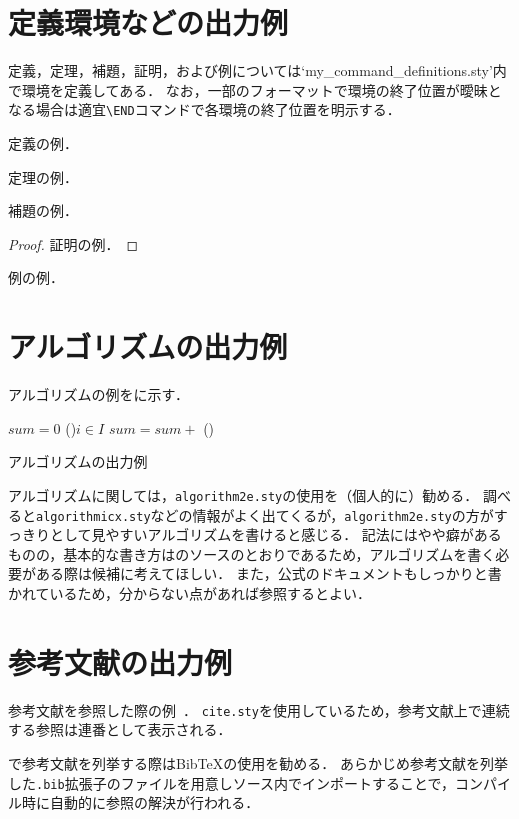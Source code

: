 \section{定義環境などの出力例}

定義，定理，補題，証明，および例については`my\_command\_definitions.sty'内で環境を定義してある．
なお，一部のフォーマットで環境の終了位置が曖昧となる場合は適宜\texttt{\textbackslash END}コマンドで各環境の終了位置を明示する．

\begin{definition}\label{def:example}
  定義の例．
  \END
\end{definition}

\begin{theorem}\label{thm:example}
  定理の例．
  \END
\end{theorem}

\begin{lemma}\label{lem:example}
  補題の例．
  \END
\end{lemma}

\begin{proof}
  証明の例．
\end{proof}

\begin{example}\label{eg:example}
  例の例．
  \END
\end{example}



\section{アルゴリズムの出力例}

アルゴリズムの例を\Fig{\ref{fig:algo:sample}}に示す．

\begin{algorithm}[t]
  \small
  \DontPrintSemicolon
  $sum = 0$\;
  \ForEach(){$i \in I$}{
    $sum = sum +$ 
  }
  \BlankLine
  \Proc(){}{
  }
  \caption{アルゴリズムの出力例}
  \label{fig:algo:sample}
\end{algorithm}

アルゴリズムに関しては，\texttt{algorithm2e.sty}の使用を（個人的に）勧める．
調べると\texttt{algorithmicx.sty}などの情報がよく出てくるが，\texttt{algorithm2e.sty}の方がすっきりとして見やすいアルゴリズムを書けると感じる．
記法にはやや癖があるものの，基本的な書き方は\Fig{\ref{fig:algo:sample}}のソースのとおりであるため，アルゴリズムを書く必要がある際は候補に考えてほしい．
また，公式のドキュメントもしっかりと書かれているため，分からない点があれば参照するとよい．



\section{参考文献の出力例}

参考文献を参照した際の例~\cite{book:Codd2002,book:Bayer2002:1,book:Bayer2002:2}．
\texttt{cite.sty}を使用しているため，参考文献上で連続する参照は連番として表示される．

{\LaTeXe}で参考文献を列挙する際はBibTeXの使用を勧める．
あらかじめ参考文献を列挙した\texttt{.bib}拡張子のファイルを用意し{\LaTeXe}ソース内でインポートすることで，コンパイル時に自動的に参照の解決が行われる．

